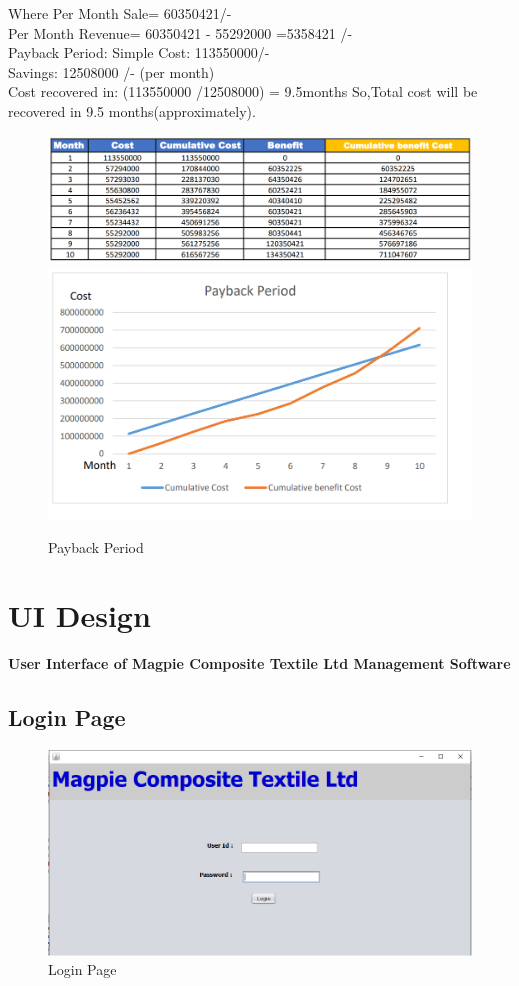 \documentclass{article}
\begin{document}
Where Per Month Sale= 60350421/-\\
Per Month Revenue= 60350421 - 55292000 =5358421 /-\\
Payback Period: Simple Cost: 113550000/-\\
Savings: 12508000 /- (per month)\\
Cost recovered in: (113550000 /12508000) = 9.5months
So,Total cost will be recovered in 9.5 months(approximately).
\newpage
\begin{figure}[h]
    \centering
    \includegraphics[width=15cm]{img/paybackexel.png}\\
    \includegraphics[width=16cm]{img/paybackgraph.png}
    \caption{Payback Period}
    \label{fig:my_label}
\end{figure}

\newpage
\section{UI Design}
\textbf{\Large User Interface of Magpie Composite Textile Ltd Management Software}
\subsection{ Login Page}
\begin{figure}[h]
    \centering
    \includegraphics[width=15 cm]{ui/loginpage.png}
    \caption{Login Page}
\end{figure}
\newpage
\end{document}
